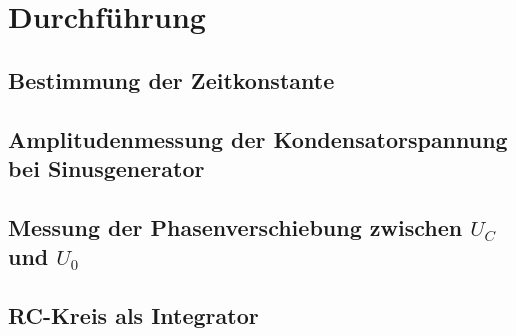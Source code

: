 \section{Durchführung}
\label{sec:Durchführung}


\subsection{Bestimmung der Zeitkonstante}


\subsection{Amplitudenmessung der Kondensatorspannung bei Sinusgenerator}


\subsection{Messung der Phasenverschiebung zwischen $U_C$ und $U_0$}


\subsection{RC-Kreis als Integrator}

